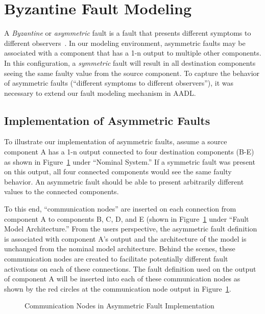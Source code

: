 \section{Byzantine Fault Modeling}
\label{sec:byzantine}
A \textit{Byzantine} or \textit{asymmetric} fault is a fault that presents different symptoms to different observers~\cite{Driscoll-Byzantine-Fault}. In our modeling environment, asymmetric faults may be associated with a component that has a 1-n output to multiple other components. In this configuration, a \textit{symmetric} fault will result in all destination components seeing the same faulty value from the source component. To capture the behavior of asymmetric faults (``different symptoms to different observers''), it was necessary to extend our fault modeling mechanism in AADL. 

\subsection{Implementation of Asymmetric Faults}
To illustrate our implementation of asymmetric faults, assume a source component A has a 1-n output connected to four destination components (B-E) as shown in Figure~\ref{fig:commNodes} under ``Nominal System.'' If a symmetric fault was present on this output, all four connected components would see the same faulty behavior. An asymmetric fault should be able to present arbitrarily different values to the connected components. 

To this end, ``communication nodes'' are inserted on each connection from component A to components B, C, D, and E (shown in Figure~\ref{fig:commNodes} under ``Fault Model Architecture.'' From the users perspective, the asymmetric fault definition is associated with component A's output and the architecture of the model is unchanged from the nominal model architecture. Behind the scenes, these communication nodes are created to facilitate potentially different fault activations on each of these connections. The fault definition used on the output of component A will be inserted into each of these communication nodes as shown by the red circles at the communication node output in Figure~\ref{fig:commNodes}.
\begin{figure}[!htb]
        \caption{\label{fig:commNodes} Communication Nodes in Asymmetric Fault Implementation}
\end{figure}

